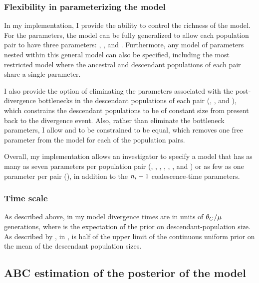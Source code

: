 \subsubsection{Flexibility in parameterizing the model}
In my implementation, I provide the ability to control the richness of the
model.
For the \myTheta{} parameters, the model can be fully generalized to
allow each population pair to have three parameters:
\ancestralTheta{}, , and .
Furthermore, any model of \myTheta{} parameters nested within this
general model can also be specified, including the most restricted model
where the ancestral and descendant populations of each pair share
a single \myTheta{} parameter.

I also provide the option of eliminating the parameters associated with the
post-divergence bottlenecks in the descendant populations of each pair
(\bottleTime{}, , and ),
which constrains the descendant populations to be of
constant size from present back to the divergence event.
Also, rather than eliminate the bottleneck parameters,
I allow  and  to be constrained to be
equal, which removes one free parameter from the model for each of the
population pairs.

Overall, my implementation allows an investigator to specify a model that has
as many as seven parameters per population pair
(\ancestralTheta{}, , ,
\bottleTime{}, , , and
\migrationRate{})
or as few as one parameter per pair
(\myTheta{}),
in addition to the $\popSampleSize{i}{} - 1$ coalescence-time parameters.

\subsubsection{Time scale}
As described above, in my model divergence times are in units of
$\theta_{C}/\mu$ generations, where  is the expectation
of the prior on descendant-population size.
As described by \citet{Oaks2012}, in \msb,  is half of the upper
limit of the continuous uniform prior on the mean of the descendant population
sizes.

\subsection{ABC estimation of the posterior of the model}
